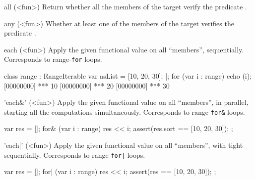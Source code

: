\begin{urbiscriptapi}
\item[all](<fun>)
  Return whether all the members of the target verify the predicate
  .


\item[any](<fun>)
  Whether at least one of the members of the target verifies the
  predicate .


\item[each](<fun>)%
  Apply the given functional value  on all ``members'',
  sequentially.  Corresponds to range-\lstinline|for| loops.
\begin{urbiscript}[firstnumber=1]
class range : RangeIterable
{
  var asList = [10, 20, 30];
}|;
for (var i : range)
  echo (i);
[00000000] *** 10
[00000000] *** 20
[00000000] *** 30
\end{urbiscript}

\item['each&'](<fun>)%
  Apply the given functional value  on all ``members'', in
  parallel, starting all the computations simultaneously.  Corresponds
  to range-\lstinline|for&| loops.
\begin{urbiscript}
{
  var res = [];
  for& (var i : range)
    res << i;
  assert(res.sort == [10, 20, 30]);
};
\end{urbiscript}

\item['each|'](<fun>)%
  Apply the given functional value  on all ``members'', with
  tight sequentially.  Corresponds to range-\lstinline'for|' loops.
\begin{urbiscript}
{
  var res = [];
  for| (var i : range)
    res << i;
  assert(res == [10, 20, 30]);
};
\end{urbiscript}
\end{urbiscriptapi}

